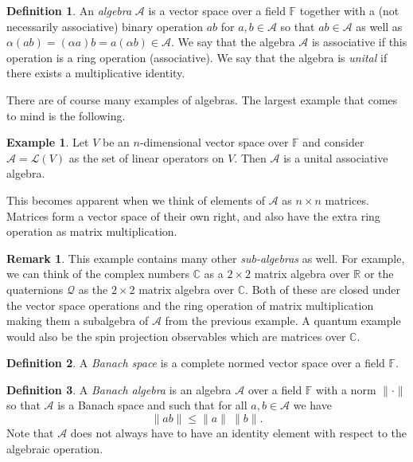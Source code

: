 \documentclass[leqno]{article}
\theoremstyle{definition}
\newtheorem{definition}{Definition}[section]
\newtheorem*{remark}{Remark}
\newtheorem*{example}{Example}
\theoremstyle{remark}
\theoremstyle{theorem}
\newcommand{\R}{\mathbb{R}}
\newcommand{\F}{\mathbb{F}}
\newcommand{\A}{\mathcal{A}}
\newcommand{\C}{\mathbb{C}}
\begin{document}
\begin{definition}
An \emph{algebra} $\A$ is a vector space over a field $\mathbb{F}$ together with a (not necessarily associative) binary operation $ab$ for $a,b\in \A$ so that $ab\in \A$ as well as $\alpha(ab)=(\alpha a)b=a(\alpha b)\in \A$. We say that the algebra $\A$ is associative if this operation is a ring operation (associative).  We say that the algebra is \emph{unital} if there exists a multiplicative identity.
\end{definition}

There are of course many examples of algebras.  The largest example that comes to mind is the following.

\begin{example}
Let $V$ be an $n$-dimensional vector space over $\mathbb{F}$ and consider $\A=\mathcal{L}(V)$ as the set of linear operators on $V$.  Then $\A$ is a unital associative algebra.  

This becomes apparent when we think of elements of $\A$ as $n\times n$ matrices. Matrices form a vector space of their own right, and also have the extra ring operation as matrix multiplication.
\end{example}

\begin{remark}
This example contains many other \emph{sub-algebras} as well.  For example, we can think of the complex numbers $\C$ as a $2\times 2$ matrix algebra over $\R$ or the quaternions $\mathcal{Q}$ as the $2\times 2$ matrix algebra over $\C$.  Both of these are closed under the vector space operations and the ring operation of matrix multiplication making them a subalgebra of $\A$ from the previous example.  A quantum example would also be the spin projection observables which are matrices over $\C$.
\end{remark}

\begin{definition}
A \emph{Banach space} is a complete normed vector space over a field $\F$.
\end{definition}

\begin{definition}
A \emph{Banach algebra} is an algebra $\A$ over a field $\F$ with a norm $\|\cdot \|$ so that $\A$ is a Banach space and such that for all $a,b\in \A$ we have
\[
\|ab\|\leq \|a\|~\|b\|.
\]
Note that $\A$ does not always have to have an identity element with respect to the algebraic operation.  
\end{definition}
\end{document}
